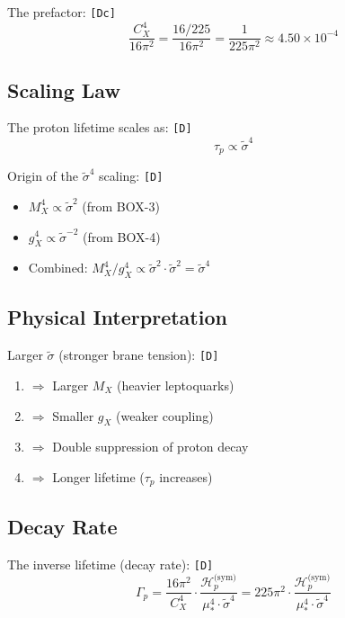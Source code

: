 \documentclass[11pt,a4paper]{article}
\newcommand{\tagD}{\textcolor{green!50!black}{\texttt{[D]}}}
\newcommand{\tagDc}{\textcolor{blue!70!black}{\texttt{[Dc]}}}
\theoremstyle{definition}
\begin{document}
The prefactor: \tagDc{}
\begin{equation}
\label{eq:prefactor-calc}
\frac{C_X^4}{16\pi^2} = \frac{16/225}{16\pi^2} = \frac{1}{225\pi^2} \approx 4.50 \times 10^{-4}
\end{equation}

\subsection{Scaling Law}
\label{subsec:scaling-law}

The proton lifetime scales as: \tagD{}
\begin{equation}
\label{eq:scaling-law}
\tau_p \propto \tilde{\sigma}^4
\end{equation}

Origin of the $\tilde{\sigma}^4$ scaling: \tagD{}
\begin{itemize}
  \item $M_X^4 \propto \tilde{\sigma}^2$ (from BOX-3)
  \item $g_X^4 \propto \tilde{\sigma}^{-2}$ (from BOX-4)
  \item Combined: $M_X^4/g_X^4 \propto \tilde{\sigma}^2 \cdot \tilde{\sigma}^2 = \tilde{\sigma}^4$
\end{itemize}

\subsection{Physical Interpretation}
\label{subsec:physical-interp}

Larger $\tilde{\sigma}$ (stronger brane tension): \tagD{}
\begin{enumerate}
  \item $\Rightarrow$ Larger $M_X$ (heavier leptoquarks)
  \item $\Rightarrow$ Smaller $g_X$ (weaker coupling)
  \item $\Rightarrow$ Double suppression of proton decay
  \item $\Rightarrow$ Longer lifetime ($\tau_p$ increases)
\end{enumerate}

\subsection{Decay Rate}
\label{subsec:decay-rate-final}

The inverse lifetime (decay rate): \tagD{}
\begin{equation}
\label{eq:decay-rate-final}
\Gamma_p = \frac{16\pi^2}{C_X^4} \cdot \frac{\mathcal{H}_p^{\text{(sym)}}}{\mu_*^4 \cdot \tilde{\sigma}^4}
= 225\pi^2 \cdot \frac{\mathcal{H}_p^{\text{(sym)}}}{\mu_*^4 \cdot \tilde{\sigma}^4}
\end{equation}
\end{document}
